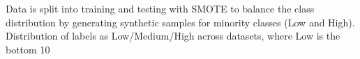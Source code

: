 \documentclass[preview]{standalone}
\begin{document}
Data is split into training and testing with SMOTE to balance the class distribution by generating synthetic samples for minority classes (Low and High).\\Distribution of labels as Low/Medium/High across datasets, where Low is the bottom 10%
\end{document}
